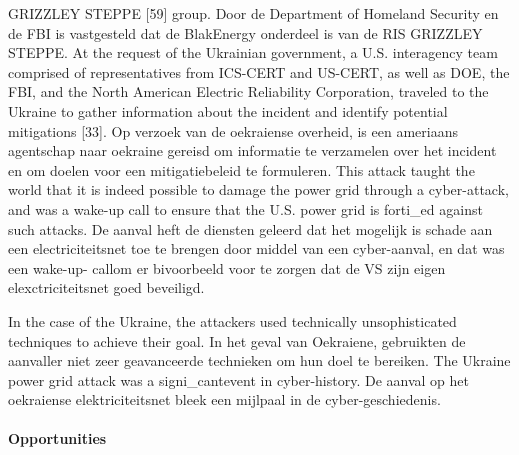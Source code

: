		GRIZZLEY STEPPE
		[59] group. Door de Department of Homeland Security en de FBI is vastgesteld dat de
		BlakEnergy onderdeel is van de RIS GRIZZLEY STEPPE.
		At the request of the Ukrainian government, a U.S. interagency team comprised of
		representatives from ICS-CERT and US-CERT, as well as DOE, the FBI, and the North
		American Electric Reliability Corporation, traveled to the Ukraine to gather information about
		the incident and identify potential mitigations [33]. Op verzoek van de oekraiense overheid, is
		een ameriaans agentschap naar oekraine gereisd om informatie te verzamelen over het
		incident en om doelen voor een mitigatiebeleid te formuleren.
		This attack taught the world that it is indeed possible to damage the power grid through a
		cyber-attack, and was a wake-up call to ensure that the U.S. power grid is forti_ed against
		such attacks. De aanval heft de diensten geleerd dat het mogelijk is schade aan een
		electriciteitsnet toe te brengen door middel van een cyber-aanval, en dat was een wake-up-
		callom er bivoorbeeld voor te zorgen dat de VS zijn eigen elexctriciteitsnet goed beveiligd.
		
		In the case of the Ukraine, the attackers used technically unsophisticated techniques to
		achieve their goal. In het geval van Oekraiene, gebruikten de aanvaller niet zeer
		geavanceerde technieken om hun doel te bereiken.
		The Ukraine power grid attack was a signi_cantevent in cyber-history. De aanval op het
		oekraiense elektriciteitsnet bleek een mijlpaal in de cyber-geschiedenis.
		
		\paragraph{Opportunities}
		
